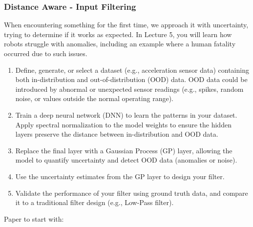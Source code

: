 \documentclass[a4paper]{article}
\begin{document}
\subsubsection{Distance Aware - Input Filtering}
When encountering something for the first time, we approach it with uncertainty, trying to determine if it works as expected. In Lecture 5, you will learn how robots struggle with anomalies, including an example where a human fatality occurred due to such issues. 
\begin{enumerate}
  \item Define, generate, or select a dataset (e.g., acceleration sensor data) containing both in-distribution and out-of-distribution (OOD) data. OOD data could be introduced by abnormal or unexpected sensor readings (e.g., spikes, random noise, or values outside the normal operating range).
  \item Train a deep neural network (DNN) to learn the patterns in your dataset. Apply spectral normalization to the model weights to ensure the hidden layers preserve the distance between in-distribution and OOD data.
  \item Replace the final layer with a Gaussian Process (GP) layer, allowing the model to quantify uncertainty and detect OOD data (anomalies or noise).
  \item Use the uncertainty estimates from the GP layer to design your filter.
  \item Validate the performance of your filter using ground truth data, and compare it to a traditional filter design (e.g., Low-Pass filter).
\end{enumerate}
Paper to start with: \citet{Liu2020}


%
\end{document}
